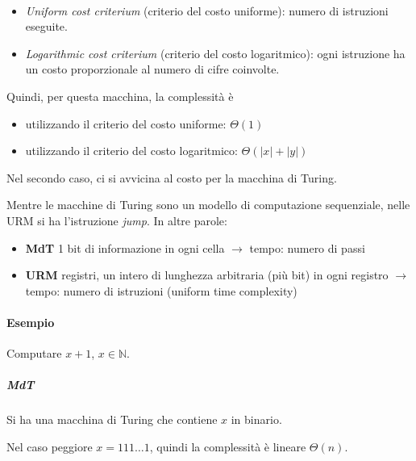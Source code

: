 \begin{definition}~
    \begin{itemize}
        \item \emph{Uniform cost criterium} (criterio del costo uniforme): numero di istruzioni eseguite.
        \item \emph{Logarithmic cost criterium} (criterio del costo logaritmico): ogni istruzione ha un costo proporzionale al numero di cifre coinvolte.
    \end{itemize}
\end{definition}
Quindi, per questa macchina, la complessità è 
\begin{itemize}
    \item utilizzando il criterio del costo uniforme: $\Theta(1)$
    \item utilizzando il criterio del costo logaritmico: $\Theta(|x|+|y|)$
\end{itemize}
Nel secondo caso, ci si avvicina al costo per la macchina di Turing. 

Mentre le macchine di Turing sono un modello di computazione sequenziale, nelle URM si ha l'istruzione \emph{jump}. %
In altre parole:
\begin{itemize}
    \item \textbf{MdT} 1 bit di informazione in ogni cella $\to$ tempo: numero di passi
    \item \textbf{URM} registri, un intero di lunghezza arbitraria (più bit) in ogni registro $\to$ tempo: numero di istruzioni (uniform time complexity)
\end{itemize}

\paragraph{Esempio} Computare $x+1$, $x\in\mathbb{N}$.
\subparagraph{MdT} Si ha una macchina di Turing che contiene $x$ in binario.
\begin{center}
\end{center}
Nel caso peggiore $x=111\dots1$, quindi la complessità è lineare $\Theta(n)$.

